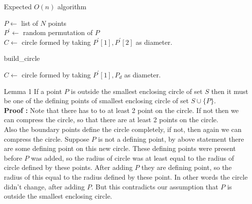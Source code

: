 \documentclass{beamer}
\begin{document}
\begin{frame}{Expected $O(n)$ algorithm}
\begin{algorithm}[H]
\SetAlgoLined
{}
 $P \leftarrow$  list of $N$ points\\
 $P^{'} \leftarrow$ random permutation of $P$ \\ 
 $C \leftarrow$ circle formed by taking $P^{'}[1], P^{'}[2]$ as diameter. \\
  {
 }

\end{algorithm}
\end{frame}


\begin{frame}{build\_circle}
\begin{algorithm}[H]
\SetAlgoLined
{}
  $C \leftarrow$ circle formed by taking $P^{'}[1], P_d$ as diameter. \\
   {
 }
\end{algorithm}
\end{frame}

\begin{frame}{Lemma 1}
If a point $P$ is outside the smallest enclosing circle of set $S$ then it must be one of the defining points of smallest enclosing circle of set $S\cup \{P\}$.
\pause
\\
\textbf{Proof : } Note that there has to to at least 2 point on the circle. If not then we can compress the circle, so that there are at least 2 points on the circle.\\
\pause
Also the boundary points define the circle completely, if not, then again we can compress the circle. Suppose $P$ is not a defining point, by above statement there are some defining point on this new circle. These defining points were present before $P$ was added, so the radius of circle was at least equal to the radius of circle defined by these points. After adding $P$ they are defining point, so the radius of this equal to the radius defined by these point. In other words the circle didn't change, after adding $P$. But this contradicts our assumption that $P$ is outside the smallest enclosing circle.
\end{frame}
\end{document}
